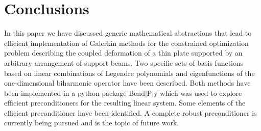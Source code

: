 \documentclass{marine_2015}
\begin{document}
\section{Conclusions}
\label{sec:end}
In this paper we have discussed generic mathematical abstractions that lead to efficient
implementation of Galerkin methods for the constrained optimization problem
describing the coupled deformation of a thin plate supported by an arbitrary arrangement 
of support beams. Two specific sets of basis functions based on linear combinations of 
Legendre polynomials and eigenfunctions of the one-dimensional biharmonic
operator have been described. Both methods have been implemented in a python package 
$\text{Bend}\!\left|\text{P}\right|\!\text{y}$ which was used to explore efficient 
preconditioners for the resulting linear system. Some elements of the efficient
preconditioner have been identified. A complete robust preconditioner is currently
being pursued and is the topic of future work.
\end{document}
